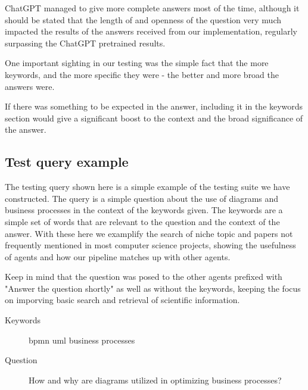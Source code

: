 \documentclass[fleqn,moreauthors,10pt]{ds_report}
\begin{document}
ChatGPT managed to give more complete answers most of the time, although it should be stated that the length of and openness of the question very much impacted the results of the answers received from our implementation, regularly surpassing the ChatGPT pretrained results.

One important sighting in our testing was the simple fact that the more keywords, and the more specific they were - the better and more broad the answers were.

If there was something to be expected in the answer, including it in the keywords section would give a significant boost to the context and the broad significance of the answer.

\subsection*{Test query example}

The testing query shown here is a simple example of the testing suite we have constructed. The query is a simple question about the use of diagrams and business processes in the context of the keywords given. The keywords are a simple set of words that are relevant to the question and the context of the answer.
With these here we examplify the search of niche topic and papers not frequently mentioned in most computer science projects, showing the usefulness of agents and how our pipeline matches up with other agents.

Keep in mind that the question was posed to the other agents prefixed with "Answer the question shortly" as well as without the keywords, keeping the focus on imporving basic search and retrieval of scientific information.

\begin{description}
	\item[Keywords] bpmn uml business processes
	\item[Question] How and why are diagrams utilized in optimizing business processes?
\end{description}
\end{document}
